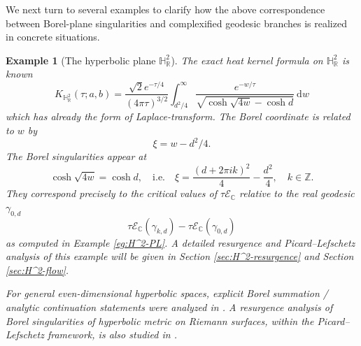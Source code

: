 \documentclass[11pt]{amsart}
\theoremstyle{plain}
\newtheorem{eg}[thm]{Example}
\theoremstyle{definition}
\newcommand{\R}{\mathbb{R}}
\newcommand{\C}{\mathbb{C}}
\newcommand{\Z}{\mathbb Z}
\newcommand{\dd}{\mathrm d}
\newcommand{\HH}{\mathbb{H}}
\begin{document}
We next turn to several examples to clarify how the above correspondence between Borel-plane singularities and complexified geodesic branches is realized in concrete situations.
\smallskip
\begin{eg}[The hyperbolic plane $\HH_{\R}^2$]
\label{eg:complex-geodesics-H2}
The exact heat kernel formula on $\HH^2_{\R}$ is known
\begin{equation*}
K_{\HH_{\R}^{2}}(\tau;a,b)
=
\frac{\sqrt{2}e^{-\tau/4}}{(4\pi \tau)^{3/2}}\int_{d^2/4}^{\infty}\frac{e^{-w/\tau}}{\sqrt{\cosh\sqrt{4w}-\cosh d}}~\dd w
\end{equation*}
which has already the form of Laplace-transform. The Borel coordinate is related to $w$ by 
$$
\xi=w-d^2/4. 
$$
The Borel singularities appear at
$$
{\cosh\sqrt{4w}}=\cosh d, \quad \text{i.e.}\quad \xi=\frac{(d+2\pi i k)^2}{4}-\frac{d^2}{4}, \quad k\in \Z.
$$
They correspond precisely to the critical values of $\tau\mathcal E_{\C}$ relative to the real geodesic $\gamma_{{0},d}$
$$
\tau\mathcal E_{\C}(\gamma_{{k},d})-\tau\mathcal E_{\C}(\gamma_{{0},d})
$$
as computed in Example \ref{eg:H^2-PL}. A detailed resurgence and Picard–Lefschetz analysis of this example will be given in Section \ref{sec:H^2-resurgence} and Section \ref{sec:H^2-flow}.


For general even-dimensional hyperbolic spaces, explicit Borel summation / analytic continuation statements were analyzed in \cite{Du}.  A resurgence analysis of Borel singularities of hyperbolic metric on Riemann surfaces, within the Picard–Lefschetz framework,  is also studied in \cite{Wu-thesis}.  

\end{eg}
\end{document}

